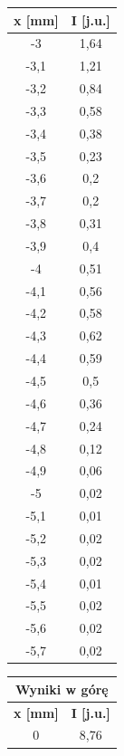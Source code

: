 \documentclass{fizykalab}
\begin{document}
\begin{table}[H]
\begin{tabular}{|c|c|}
    \end{tabular}
    \begin{tabular}{|c|c|}
        \hline
        \textbf{x [mm]} & \textbf{I [j.u.]} \\ \hline
        
        -3 & 1,64 \\ \hline
        -3,1 & 1,21 \\ \hline
        -3,2 & 0,84 \\ \hline
        -3,3 & 0,58 \\ \hline
        -3,4 & 0,38 \\ \hline
        -3,5 & 0,23 \\ \hline
        -3,6 & 0,2 \\ \hline
        -3,7 & 0,2 \\ \hline
        -3,8 & 0,31 \\ \hline
        -3,9 & 0,4 \\ \hline
        -4 & 0,51 \\ \hline
        -4,1 & 0,56 \\ \hline
        -4,2 & 0,58 \\ \hline
        -4,3 & 0,62 \\ \hline
        -4,4 & 0,59 \\ \hline
        -4,5 & 0,5 \\ \hline
        -4,6 & 0,36 \\ \hline
        -4,7 & 0,24 \\ \hline
        -4,8 & 0,12 \\ \hline
        -4,9 & 0,06 \\ \hline
        -5 & 0,02 \\ \hline
        -5,1 & 0,01 \\ \hline
        -5,2 & 0,02 \\ \hline
        -5,3 & 0,02 \\ \hline
        -5,4 & 0,01 \\ \hline
        -5,5 & 0,02 \\ \hline
        -5,6 & 0,02 \\ \hline
        -5,7 & 0,02 \\ \hline
    \end{tabular}
    \quad
    \quad
    \begin{tabular}{|c|c|}
        \hline
        \multicolumn{2}{|c|}{Wyniki w górę} \\ \hline
        \textbf{x [mm]} & \textbf{I [j.u.]} \\ \hline
        0 & 8,76 \\ \hline

\end{tabular}
\end{table}
\end{document}
